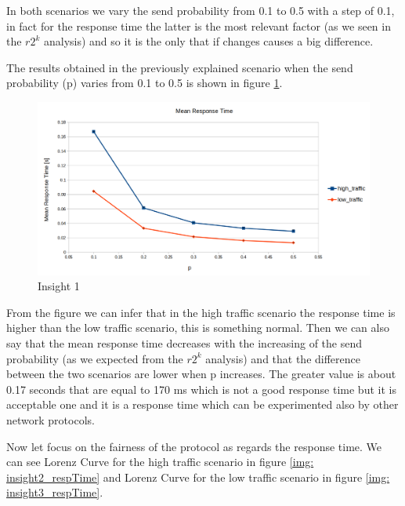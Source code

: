 \noindent In both scenarios we vary the send probability from 0.1 to 0.5 with a step of 0.1, in fact for the response time the latter is the most relevant factor (as we seen in the $r2^k$ analysis) and so it is the only that if changes causes a big difference.

\noindent The results obtained in the previously explained scenario when the send probability (p) varies from 0.1 to 0.5 is shown in figure \ref{img: insight1_respTime}.
\begin{figure}[H]
	\centering
	\includegraphics[width=\textwidth]{img/MeanResponseTimeInsight.png}
	\caption{Insight 1}
	\label{img: insight1_respTime}
\end{figure}

\noindent From the figure we can infer that in the high traffic scenario the response time is higher than the low traffic scenario, this is something normal. Then we can also say that the mean response time decreases with the increasing of the send probability (as we expected from the $r2^k$ analysis) and that the difference between the two scenarios are lower when p increases. The greater value is about 0.17 seconds that are equal to 170 ms which is not a good response time but it is acceptable one and it is a response time which can be experimented also by other network protocols.

\noindent Now let focus on the fairness of the protocol as regards the response time. We can see Lorenz Curve for the high traffic scenario in figure \ref{img: insight2_respTime} and Lorenz Curve for the low traffic scenario in figure \ref{img: insight3_respTime}.

